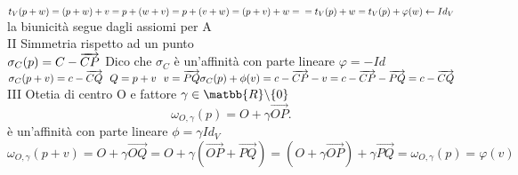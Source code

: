 \documentclass[12px]{article}
\begin{document}
$t_V(p + w) = (p + w) + v = p + (w + v) = p + (v + w) = (p + v) + w =\\ = t_V(p) + w = t_V(p) +  \varphi (w) \leftarrow Id_V$ \\
la biunicità segue dagli assiomi per A \\[10px]
II Simmetria rispetto ad un punto\\
$\sigma_C(p) = C - \overrightarrow{CP}\\
$ Dico che $\sigma_C$ è un'affinità con parte lineare $ \varphi = -Id$\\
$\sigma_C(p + v) = c - \overrightarrow{CQ} \ \ Q = p + v \ \ v = \overrightarrow{PQ} \\
\sigma_C(p) + \phi(v) = c - \overrightarrow{CP} - v = c - \overrightarrow{CP} - \overrightarrow{PQ} = c - \overrightarrow{CQ}$ \\
III Otetia di centro O e fattore $\gamma\in\matbb{R}\backslash \{ 0 \} $ \\ 
\[
	\omega_{O,\gamma}(p) = O + \gamma \overrightarrow{OP}
.\] 
è un'affinità con parte lineare $\phi = \gamma Id_V$\\
$\omega_{O,\gamma}(p + v) = O + \gamma \overrightarrow{OQ} = O + \gamma( \overrightarrow{OP} + \overrightarrow{PQ}) = (O + \gamma \overrightarrow{OP}) + \gamma \overrightarrow{PQ} = \omega_{O,\gamma}(p) = \varphi(v)$
\end{document}
